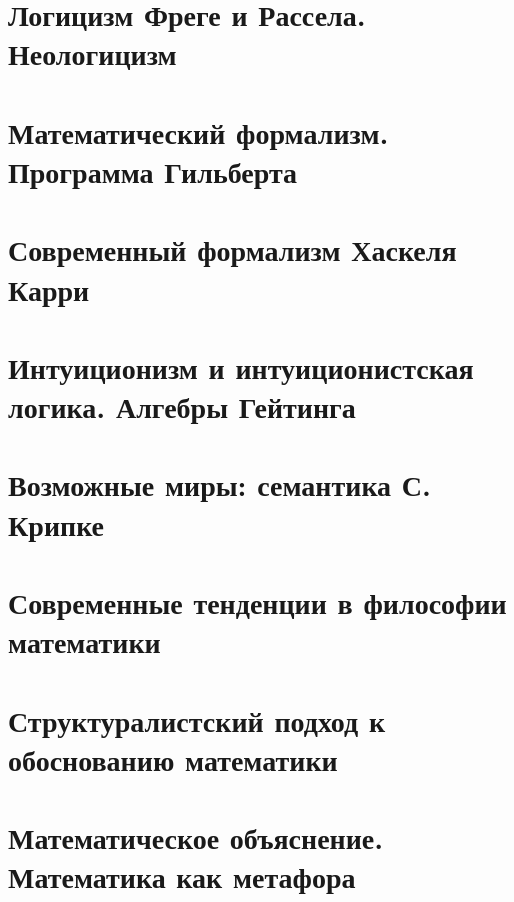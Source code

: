 \documentclass[12pt, specialist, subf, substylefile = spbu.rtx]{disser}
\begin{document}
\section{Логицизм Фреге и Рассела. Неологицизм}
\section{Математический формализм. Программа Гильберта}
\section{Современный формализм Хаскеля Карри}
\section{Интуиционизм и интуиционистская логика. Алгебры Гейтинга}
\section{Возможные миры: семантика С. Крипке}
\section{Современные тенденции в философии математики}
\section{Структуралистский подход к обоснованию математики}
\section{Математическое объяснение. Математика как метафора}
\end{document}
